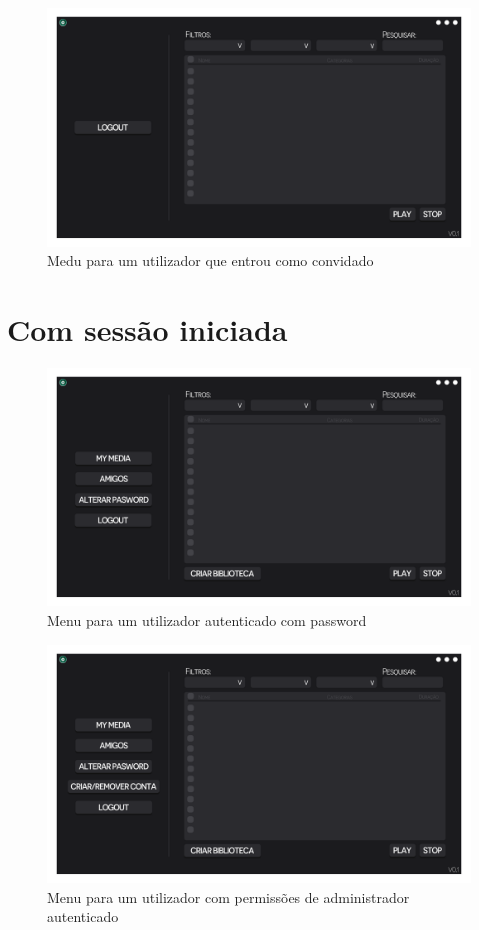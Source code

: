 \documentclass[a4paper]{report}
\begin{document}
\begin{figure}[H]
	\centering 
    \includegraphics[width=\textwidth]{images/Principal_convidado_Menu.png}  
    \caption{Medu para um utilizador que entrou como convidado}
\end{figure}

\section{Com sessão iniciada}

\begin{figure}[H]
	\centering 
    \includegraphics[width=\textwidth]{images/Principal_Menu.png}  
    \caption{Menu para um utilizador autenticado com password}
\end{figure}

\begin{figure}[H]
	\centering 
    \includegraphics[width=\textwidth]{images/Principal_Admin_Menu.png}  
    \caption{Menu para um utilizador com permissões de administrador autenticado}
\end{figure}
\end{document}
